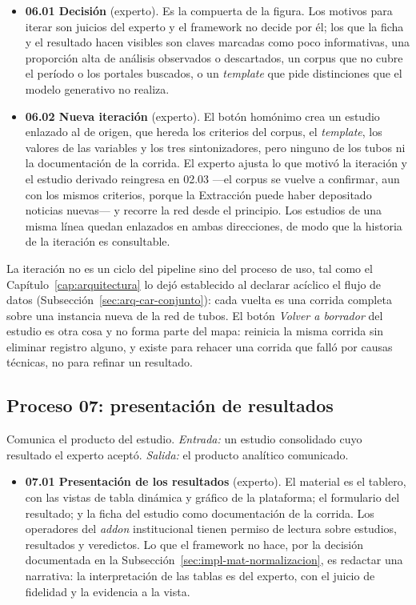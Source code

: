 \documentclass[12pt]{report}
\begin{document}
\begin{itemize}
  \item \textbf{06.01 Decisión} (experto). Es la compuerta de la figura. Los motivos para iterar son juicios del experto y el framework no decide por él; los que la ficha y el resultado hacen visibles son claves marcadas como poco informativas, una proporción alta de análisis observados o descartados, un corpus que no cubre el período o los portales buscados, o un \textit{template} que pide distinciones que el modelo generativo no realiza.
  \item \textbf{06.02 Nueva iteración} (experto). El botón homónimo crea un estudio enlazado al de origen, que hereda los criterios del corpus, el \textit{template}, los valores de las variables y los tres sintonizadores, pero ninguno de los tubos ni la documentación de la corrida. El experto ajusta lo que motivó la iteración y el estudio derivado reingresa en 02.03 ---el corpus se vuelve a confirmar, aun con los mismos criterios, porque la Extracción puede haber depositado noticias nuevas--- y recorre la red desde el principio. Los estudios de una misma línea quedan enlazados en ambas direcciones, de modo que la historia de la iteración es consultable.
\end{itemize}

La iteración no es un ciclo del pipeline sino del proceso de uso, tal como el Capítulo~\ref{cap:arquitectura} lo dejó establecido al declarar acíclico el flujo de datos (Subsección~\ref{sec:arq-car-conjunto}): cada vuelta es una corrida completa sobre una instancia nueva de la red de tubos. El botón \textit{Volver a borrador} del estudio es otra cosa y no forma parte del mapa: reinicia la misma corrida sin eliminar registro alguno, y existe para rehacer una corrida que falló por causas técnicas, no para refinar un resultado.

\subsection{Proceso 07: presentación de resultados}
\label{sec:proc-presentacion}

Comunica el producto del estudio. \textit{Entrada:} un estudio consolidado cuyo resultado el experto aceptó. \textit{Salida:} el producto analítico comunicado.

\begin{itemize}
  \item \textbf{07.01 Presentación de los resultados} (experto). El material es el tablero, con las vistas de tabla dinámica y gráfico de la plataforma; el formulario del resultado; y la ficha del estudio como documentación de la corrida. Los operadores del \textit{addon} institucional tienen permiso de lectura sobre estudios, resultados y veredictos. Lo que el framework no hace, por la decisión documentada en la Subsección~\ref{sec:impl-mat-normalizacion}, es redactar una narrativa: la interpretación de las tablas es del experto, con el juicio de fidelidad y la evidencia a la vista.
\end{itemize}
\end{document}
